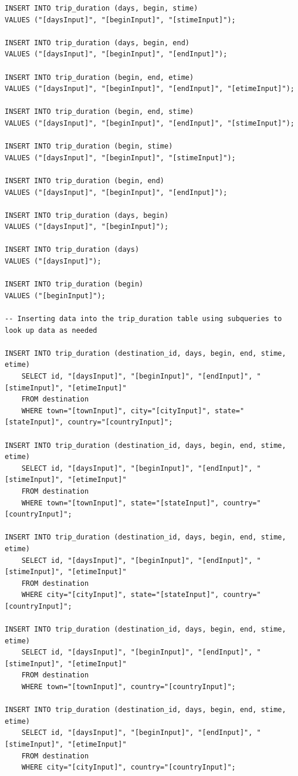 \documentclass[letterpaper,10pt,onecolumn,compsoc]{IEEEtran}
\begin{document}
\begin{verbatim}
INSERT INTO trip_duration (days, begin, stime) 
VALUES ("[daysInput]", "[beginInput]", "[stimeInput]");

INSERT INTO trip_duration (days, begin, end) 
VALUES ("[daysInput]", "[beginInput]", "[endInput]");

INSERT INTO trip_duration (begin, end, etime) 
VALUES ("[daysInput]", "[beginInput]", "[endInput]", "[etimeInput]");

INSERT INTO trip_duration (begin, end, stime) 
VALUES ("[daysInput]", "[beginInput]", "[endInput]", "[stimeInput]");

INSERT INTO trip_duration (begin, stime) 
VALUES ("[daysInput]", "[beginInput]", "[stimeInput]");

INSERT INTO trip_duration (begin, end) 
VALUES ("[daysInput]", "[beginInput]", "[endInput]");

INSERT INTO trip_duration (days, begin) 
VALUES ("[daysInput]", "[beginInput]");

INSERT INTO trip_duration (days) 
VALUES ("[daysInput]");

INSERT INTO trip_duration (begin) 
VALUES ("[beginInput]");

-- Inserting data into the trip_duration table using subqueries to look up data as needed

INSERT INTO trip_duration (destination_id, days, begin, end, stime, etime) 
	SELECT id, "[daysInput]", "[beginInput]", "[endInput]", "[stimeInput]", "[etimeInput]" 
	FROM destination 
	WHERE town="[townInput]", city="[cityInput]", state="[stateInput]", country="[countryInput]";
	
INSERT INTO trip_duration (destination_id, days, begin, end, stime, etime) 
	SELECT id, "[daysInput]", "[beginInput]", "[endInput]", "[stimeInput]", "[etimeInput]" 
	FROM destination 
	WHERE town="[townInput]", state="[stateInput]", country="[countryInput]";
	
INSERT INTO trip_duration (destination_id, days, begin, end, stime, etime) 
	SELECT id, "[daysInput]", "[beginInput]", "[endInput]", "[stimeInput]", "[etimeInput]" 
	FROM destination 
	WHERE city="[cityInput]", state="[stateInput]", country="[countryInput]";
	
INSERT INTO trip_duration (destination_id, days, begin, end, stime, etime) 
	SELECT id, "[daysInput]", "[beginInput]", "[endInput]", "[stimeInput]", "[etimeInput]" 
	FROM destination 
	WHERE town="[townInput]", country="[countryInput]";
	
INSERT INTO trip_duration (destination_id, days, begin, end, stime, etime) 
	SELECT id, "[daysInput]", "[beginInput]", "[endInput]", "[stimeInput]", "[etimeInput]" 
	FROM destination 
	WHERE city="[cityInput]", country="[countryInput]";
	

\end{verbatim}
\end{document}
